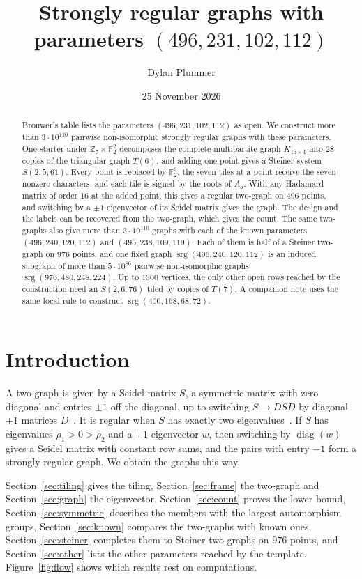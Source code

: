 \documentclass[11pt]{amsart}
\title[Strongly regular graphs on 496 vertices]{Strongly regular graphs with parameters $(496,231,102,112)$}
\author{Dylan Plummer}
\date{25 November 2026}
\theoremstyle{remark}
\newcommand{\F}{\mathbb{F}}
\newcommand{\Z}{\mathbb{Z}}
\DeclareMathOperator{\srg}{srg}
\begin{document}
\begin{abstract}
Brouwer's table lists the parameters $(496,231,102,112)$ as open. We construct more than $3\cdot10^{110}$ pairwise non-isomorphic strongly regular graphs with these parameters. One starter under $\Z_7\times\F_2^2$ decomposes the complete multipartite graph $K_{15\times4}$ into $28$ copies of the triangular graph $T(6)$, and adding one point gives a Steiner system $S(2,5,61)$. Every point is replaced by $\F_2^3$, the seven tiles at a point receive the seven nonzero characters, and each tile is signed by the roots of $A_5$. With any Hadamard matrix of order $16$ at the added point, this gives a regular two-graph on $496$ points, and switching by a $\pm1$ eigenvector of its Seidel matrix gives the graph. The design and the labels can be recovered from the two-graph, which gives the count. The same two-graphs also give more than $3\cdot10^{110}$ graphs with each of the known parameters $(496,240,120,112)$ and $(495,238,109,119)$. Each of them is half of a Steiner two-graph on $976$ points, and one fixed graph $\srg(496,240,120,112)$ is an induced subgraph of more than $5\cdot10^{86}$ pairwise non-isomorphic graphs $\srg(976,480,248,224)$. Up to $1300$ vertices, the only other open rows reached by the construction need an $S(2,6,76)$ tiled by copies of $T(7)$. A companion note uses the same local rule to construct $\srg(400,168,68,72)$.
\end{abstract}

\maketitle

\section{Introduction}

A two-graph is given by a Seidel matrix $S$, a symmetric matrix with zero diagonal and entries $\pm1$ off the diagonal, up to switching $S\mapsto DSD$ by diagonal $\pm1$ matrices $D$~\cite{Sei76}. It is regular when $S$ has exactly two eigenvalues~\cite{Tay77}. If $S$ has eigenvalues $\rho_1>0>\rho_2$ and a $\pm1$ eigenvector $w$, then switching by $\operatorname{diag}(w)$ gives a Seidel matrix with constant row sums, and the pairs with entry $-1$ form a strongly regular graph. We obtain the graphs this way.

Section~\ref{sec:tiling} gives the tiling, Section~\ref{sec:frame} the two-graph and Section~\ref{sec:graph} the eigenvector. Section~\ref{sec:count} proves the lower bound, Section~\ref{sec:symmetric} describes the members with the largest automorphism groups, Section~\ref{sec:known} compares the two-graphs with known ones, Section~\ref{sec:steiner} completes them to Steiner two-graphs on $976$ points, and Section~\ref{sec:other} lists the other parameters reached by the template. Figure~\ref{fig:flow} shows which results rest on computations.
\end{document}
